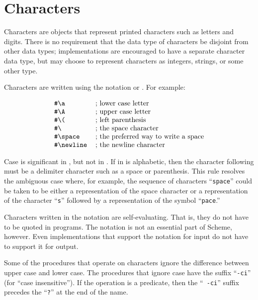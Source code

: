 \section{Characters}
\label{charactersection}

Characters are objects that represent printed characters such as
letters and digits.  There is no requirement that the data type of
characters be disjoint from other data types; implementations are
encouraged to have a separate character data type, but may choose to
represent characters as integers, strings, or some other type.

Characters are written using the notation \sharpsign\backwhack{}
or \sharpsign\backwhack{}.
For example:

$$
\begin{tabular}{ll}
{\tt \#\backwhack{}a}&; lower case letter\\
{\tt \#\backwhack{}A}&; upper case letter\\
{\tt \#\backwhack{}(}&; left parenthesis\\
{\tt \#\backwhack{} }&; the space character\\
{\tt \#\backwhack{}space}&; the preferred way to write a space\\
{\tt \#\backwhack{}newline}&; the newline character\\
\end{tabular}
$$

Case is significant in \sharpsign\backwhack{}, but not in
\sharpsign\backwhack{}.  If  in
\sharpsign\backwhack{} is alphabetic, then the character
following  must be a delimiter character such as a
space or parenthesis.  This rule resolves the ambiguous case where, for
example, the sequence of characters ``{\tt\sharpsign\backwhack space}''
could be taken to be either a representation of the space character or a
representation of the character ``{\tt\sharpsign\backwhack s}'' followed
by a representation of the symbol ``{\tt pace}.''

Characters written in the \sharpsign\backwhack{} notation are self-evaluating.
That is, they do not have to be quoted in programs.  The \sharpsign\backwhack{}
notation is not an essential part of Scheme, however.  Even implementations
that support the \sharpsign\backwhack{} notation for input do not have to support
it for output.

\vest Some of the procedures that operate on characters ignore the
difference between upper case and lower case.  The procedures that
ignore case have the suffix \hbox{``{\tt -ci}''} (for ``case
insensitive'').  If the operation is a predicate, then the \hbox{``{\tt
-ci}''} suffix precedes the \hbox{``{\tt ?}''} at the end of the name.



